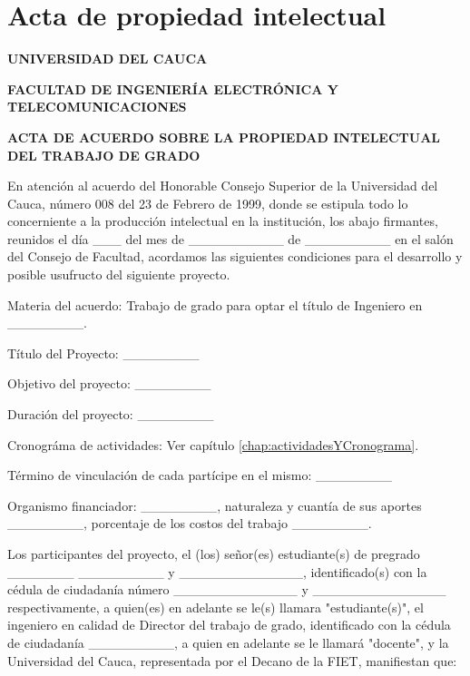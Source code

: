\def\baselinestretch{1}
\chapter{Acta de propiedad intelectual}
\ifpdf
    \graphicspath{{actapropiedadintelectual/actapropiedadintelectualFigs/PNG/}{actapropiedadintelectual/actapropiedadintelectualFigs/PDF/}{actapropiedadintelectual/actapropiedadintelectualFigs/}}
\else
    \graphicspath{{actapropiedadintelectual/actapropiedadintelectualFigs/EPS/}{actapropiedadintelectual/actapropiedadintelectualFigs/}}
\fi

\def\baselinestretch{1.66}

\begin{center}
\textbf{UNIVERSIDAD DEL CAUCA}

\textbf{FACULTAD DE INGENIERÍA ELECTRÓNICA Y TELECOMUNICACIONES}

\textbf{ACTA DE ACUERDO SOBRE LA PROPIEDAD INTELECTUAL DEL TRABAJO DE GRADO}
\end{center}

En atención al acuerdo del Honorable Consejo Superior de la Universidad del Cauca, número 008 del 23 de Febrero de 1999, donde se estipula todo lo concerniente a la producción intelectual en la institución, los abajo firmantes, reunidos el día \_\_\_ del mes de \_\_\_\_\_\_\_\_\_\_ de \_\_\_\_\_\_\_\_\_ en el salón del Consejo de Facultad, acordamos las siguientes condiciones para el desarrollo y posible usufructo del siguiente proyecto.

Materia del acuerdo: Trabajo de grado para optar el título de Ingeniero en \_\_\_\_\_\_\_\_.

Título del Proyecto: \_\_\_\_\_\_\_\_

Objetivo del proyecto: \_\_\_\_\_\_\_\_

Duración del proyecto: \_\_\_\_\_\_\_\_

Cronográma de actividades: Ver capítulo \ref{chap:actividadesYCronograma}.

Término de vinculación de cada partícipe en el mismo: \_\_\_\_\_\_\_\_

Organismo financiador: \_\_\_\_\_\_\_\_, naturaleza y cuantía de sus aportes \_\_\_\_\_\_\_\_, porcentaje de los costos del trabajo \_\_\_\_\_\_\_\_. 

Los participantes del proyecto, el (los) señor(es) estudiante(s) de pregrado \_\_\_\_\_\_\_ \_\_\_\_\_\_\_\_\_ y \_\_\_\_\_\_\_\_\_\_\_\_\_, identificado(s) con la cédula de ciudadanía número \_\_\_\_\_\_\_\_\_\_\_\_\_ y \_\_\_\_\_\_\_\_\_\_\_\_\_\_ respectivamente, a quien(es) en adelante se le(s) llamara "estudiante(s)", el ingeniero en calidad de Director del trabajo de grado, identificado con la cédula de ciudadanía \_\_\_\_\_\_\_\_\_, a quien en adelante se le llamará "docente", y la Universidad del Cauca, representada por el Decano de la FIET, manifiestan que:

